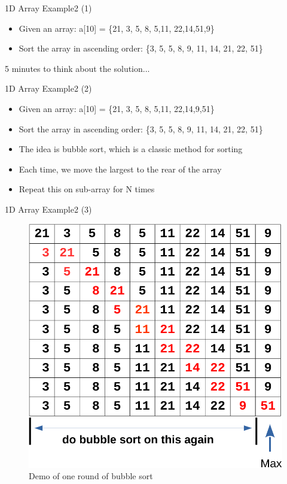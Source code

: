 \begin{frame}{1D Array Example2 (1)}
	\begin{itemize}
		\item {Given an array: a[10] = \{21, 3, 5, 8, 5,11, 22,14,51,9\}}
		\item {Sort the array in ascending order: \{3, 5, 5, 8, 9, 11, 14, 21, 22, 51\}}
	\end{itemize}
	\vspace{0.2in}
	\begin{center}
		\Large{5 minutes to think about the solution...}
	\end{center}
\end{frame}

\begin{frame}{1D Array Example2 (2)}
	\begin{itemize}
		\item {Given an array: a[10] = \{21, 3, 5, 8, 5,11, 22,14,9,51\}}
		\item {Sort the array in ascending order: \{3, 5, 5, 8, 9, 11, 14, 21, 22, 51\}}
	\end{itemize}
	\begin{itemize}
		\item {The idea is bubble sort, which is a classic method for sorting}
		\item {Each time, we move the largest to the rear of the array}
		\item {Repeat this on sub-array for N times}
	\end{itemize}
\end{frame}

\begin{frame}{1D Array Example2 (3)}
\begin{figure}
	\includegraphics[width=0.55\linewidth]{figs/bubblesort.pdf}
	\caption{Demo of one round of bubble sort}
\end{figure}
\end{frame}

